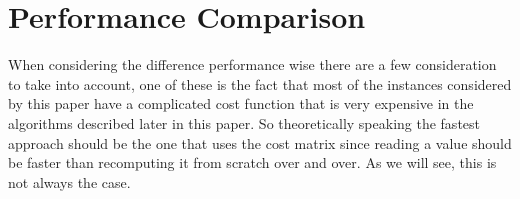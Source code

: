 \section{Performance Comparison}

When considering the difference performance wise there are a few consideration to take into account, one of these is the fact that most of the instances considered by this paper have a complicated cost function that is very expensive in the algorithms described later in this paper. So theoretically speaking the fastest approach should be the one that uses the cost matrix since reading a value should be faster than recomputing it from scratch over and over. As we will see, this is not always the case. 
